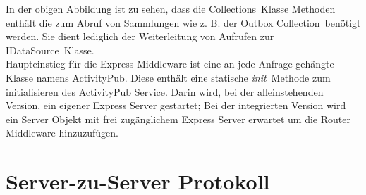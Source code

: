 In der obigen Abbildung ist zu sehen, dass die \glqq Collections\grqq~Klasse Methoden enthält die zum Abruf von Sammlungen wie z. B. der \glqq Outbox Collection\grqq~benötigt werden. Sie dient lediglich der Weiterleitung von Aufrufen zur \glqq IDataSource\grqq~Klasse.\\

Haupteinstieg für die Express Middleware ist eine an jede Anfrage gehängte Klasse namens ActivityPub. Diese enthält eine statische \glqq \textit{init}\grqq~Methode zum initialisieren des ActivityPub Service. Darin wird, bei der alleinstehenden Version, ein eigener Express Server gestartet; Bei der integrierten Version wird ein Server Objekt mit frei zugänglichem Express Server erwartet um die Router Middleware hinzuzufügen.\\

\section{Server-zu-Server Protokoll}
